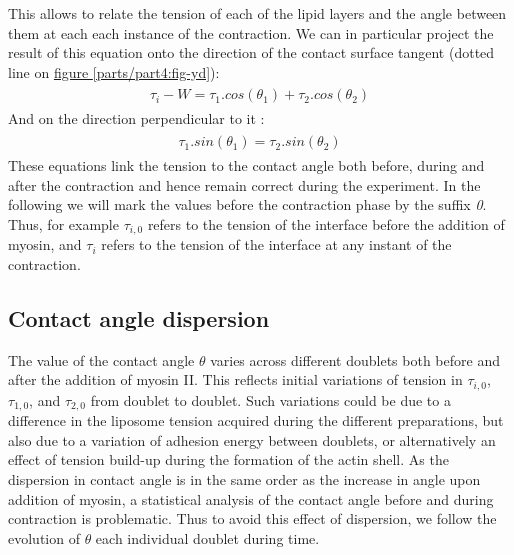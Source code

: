 \documentclass[A4paperpaper,11pt,english]{sphinxmanual}
\begin{document}
This allows
to relate the tension of each of the lipid layers and the angle
between them at each each instance of the contraction. We can in particular project
the result of this equation onto the direction of the contact surface
tangent (dotted line on \hyperref[parts/part4:fig-yd]{figure  \ref*{parts/part4:fig-yd}}):
\label{parts/part4:equation-young-tangent}\begin{gather}
\begin{split}\tau_i - W = \tau_1.cos(\theta_1) + \tau_2.cos(\theta_2)\end{split}\label{parts/part4-young-tangent}
\end{gather}
And on the direction perpendicular to it :
\label{parts/part4:equation-young-perpendicular}\begin{gather}
\begin{split} \tau_1.sin(\theta_1) = \tau_2.sin(\theta_2)\end{split}\label{parts/part4-young-perpendicular}
\end{gather}
These equations link the tension to the contact angle both before, during and
after the contraction and hence remain correct during the experiment. In the following we will mark the values
before the contraction phase by
the suffix \emph{0}. Thus, for example \(\tau_{i,0}\) refers to the
tension of the interface before the addition of myosin, and \(\tau_i\) refers to the
tension of the interface at any instant of the contraction.


\subsection{Contact angle dispersion}
\label{parts/part4:contact-angle-dispersion}
The value of the contact angle \(\theta\) varies across different doublets both before
and after the  addition of myosin II. This reflects initial variations of tension in
\(\tau_{i,0}\), \(\tau_{1,0}\), and \(\tau_{2,0}\) from doublet to doublet. Such variations could be
due to a difference in the liposome tension acquired during the different preparations, but also due to a
variation of adhesion energy between doublets, or alternatively an effect of tension build-up
during the formation of the actin shell. As the dispersion in contact angle is
in the same order as the increase in angle upon addition of myosin, a
statistical analysis of the contact angle before and during contraction is
problematic. Thus to avoid this effect of dispersion, we follow the evolution of
\(\theta\) each individual doublet during time.
\end{document}

